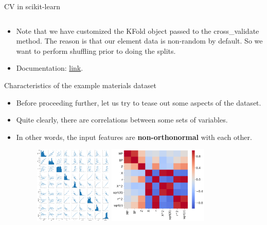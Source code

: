 \documentclass[aspectratio=169]{beamer}
\begin{document}
\begin{frame}[fragile]{CV in scikit-learn}
\inputminted{python}{example_sklearn_cv.py}
\begin{itemize}
    \item Note that we have customized the KFold object passed to the cross\_validate method. The reason is that our element data is non-random by default. So we want to perform shuffling prior to doing the splits.
    \item Documentation: \href{https://scikit-learn.org/stable/modules/generated/sklearn.model_selection.cross_validate.html?highlight=cross_validate#sklearn.model_selection.cross_validate}{link}.
\end{itemize}
\end{frame}


\begin{frame}{Characteristics of the example materials dataset}
    \begin{itemize}
        \item Before proceeding further, let us try to tease out some aspects of the dataset.
        \item Quite clearly, there are correlations between some sets of variables.
        \item In other words, the input features are \textbf{non-orthonormal} with each other.
        \begin{figure}
            \centering
            \includegraphics[width=0.35\textwidth]{figures/pairplot-materialsdata.png}
            \includegraphics[width=0.45\textwidth]{figures/paircorrelations-materialsdata.png}
        \end{figure}
    \end{itemize}
\end{frame}
\end{document}
